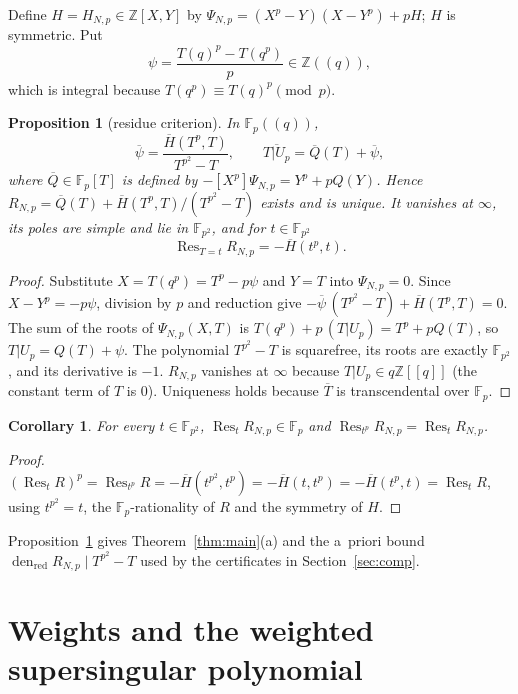 \documentclass[11pt,a4paper]{article}
\numberwithin{equation}{section}
\newtheorem{proposition}[theorem]{Proposition}
\newtheorem{corollary}[theorem]{Corollary}
\theoremstyle{definition}
\theoremstyle{remark}
\newcommand{\Fp}{\mathbb F_p}
\newcommand{\Fq}{\mathbb F_{p^2}}
\newcommand{\Z}{\mathbb Z}
\newcommand{\Res}{\operatorname{Res}}
\newcommand{\den}{\operatorname{den}_{\mathrm{red}}}
\begin{document}
Define $H=H_{N,p}\in\Z[X,Y]$ by $\Psi_{N,p}=(X^p-Y)(X-Y^p)+pH$; $H$ is symmetric. Put
\[
\psi=\frac{T(q)^p-T(q^p)}{p}\in\Z((q)),
\]
which is integral because $T(q^p)\equiv T(q)^p\pmod p$.

\begin{proposition}[residue criterion]\label{prop:res}
In $\Fp((q))$,
\[
\overline\psi=\frac{\overline H(T^p,T)}{T^{p^2}-T},\qquad
\overline{T|U_p}=\overline Q(T)+\overline\psi,
\]
where $\overline Q\in\Fp[T]$ is defined by $-[X^p]\Psi_{N,p}=Y^p+pQ(Y)$. Hence
$R_{N,p}=\overline Q(T)+\overline H(T^p,T)/(T^{p^2}-T)$ exists and is unique. It vanishes at
$\infty$, its poles are simple and lie in $\Fq$, and for $t\in\Fq$
\[
\Res_{T=t}R_{N,p}=-\overline H(t^p,t).
\]
\end{proposition}
\begin{proof}
Substitute $X=T(q^p)=T^p-p\psi$ and $Y=T$ into
$\Psi_{N,p}=0$. Since $X-Y^p=-p\psi$, division by $p$ and reduction give
$-\overline\psi\,(T^{p^2}-T)+\overline H(T^p,T)=0$. The sum of the roots of $\Psi_{N,p}(X,T)$ is
$T(q^p)+p\,(T|U_p)=T^p+pQ(T)$, so $T|U_p=Q(T)+\psi$. The polynomial $T^{p^2}-T$ is squarefree, its
roots are exactly $\Fq$, and its derivative is $-1$. $R_{N,p}$ vanishes at $\infty$ because
$T|U_p\in q\Z[[q]]$ (the constant term of $T$ is $0$). Uniqueness holds because $\overline T$ is
transcendental over $\Fp$.
\end{proof}

\begin{corollary}\label{cor:rFp}
For every $t\in\Fq$, $\Res_{t}R_{N,p}\in\Fp$ and $\Res_{t^p}R_{N,p}=\Res_tR_{N,p}$.
\end{corollary}
\begin{proof}
$(\Res_tR)^p=\Res_{t^p}R=-\overline H(t^{p^2},t^p)=-\overline H(t,t^p)=-\overline H(t^p,t)=\Res_tR$, using
$t^{p^2}=t$, the $\Fp$-rationality of $R$ and the symmetry of $H$.
\end{proof}

Proposition~\ref{prop:res} gives Theorem~\ref{thm:main}(a) and the a~priori bound
$\den R_{N,p}\mid T^{p^2}-T$ used by the certificates in Section~\ref{sec:comp}.

\section{Weights and the weighted supersingular polynomial}\label{sec:weights}
\end{document}
